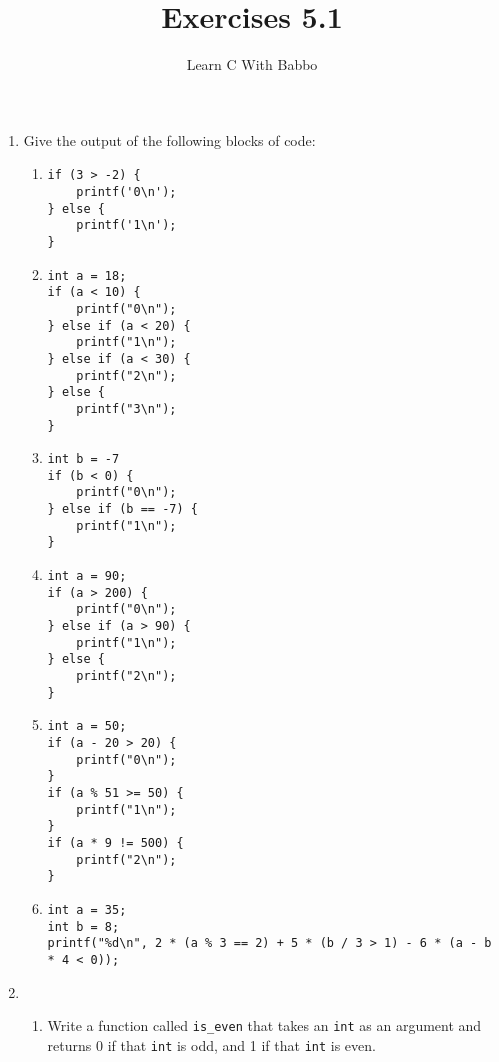 \documentclass{article}
\begin{document}
\title{Exercises 5.1}
\author{Learn C With Babbo}
\date{}
\maketitle
\begin{enumerate}
\item
Give the output of the following blocks of code:
\begin{enumerate}
\item 
\begin{lstlisting}[style=CStyle]
if (3 > -2) {
    printf('0\n');
} else {
    printf('1\n');
}
\end{lstlisting}

\item 
\begin{lstlisting}[style=CStyle]
int a = 18;
if (a < 10) {
    printf("0\n");
} else if (a < 20) {
    printf("1\n");
} else if (a < 30) {
    printf("2\n");
} else {
    printf("3\n");
}
\end{lstlisting}

\item
\begin{lstlisting}[style=CStyle]
int b = -7
if (b < 0) {
    printf("0\n");
} else if (b == -7) {
    printf("1\n");
}
\end{lstlisting}

\item
\begin{lstlisting}[style=CStyle]
int a = 90;
if (a > 200) {
    printf("0\n");
} else if (a > 90) {
    printf("1\n");
} else {
    printf("2\n");
}
\end{lstlisting}

\item
\begin{lstlisting}[style=CStyle]
int a = 50;
if (a - 20 > 20) {
    printf("0\n");
} 
if (a % 51 >= 50) {
    printf("1\n");    
}
if (a * 9 != 500) {
    printf("2\n");
}
\end{lstlisting}

\item
\begin{lstlisting}[style=CStyle]
int a = 35;
int b = 8;
printf("%d\n", 2 * (a % 3 == 2) + 5 * (b / 3 > 1) - 6 * (a - b * 4 < 0));
\end{lstlisting}
\end{enumerate}

\item 
\begin{enumerate}
\item Write a function called \verb|is_even| that takes an \verb|int| as an argument and returns 0 if that \verb|int|
is odd, and 1 if that \verb|int| is even.


\end{enumerate}
\end{enumerate}
\end{document}

